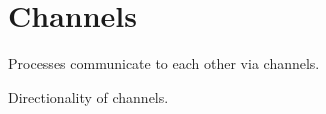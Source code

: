 

\chapter{Channels}
\label{sec:channels}

Processes communicate to each other via channels.  

Directionality of channels.  

